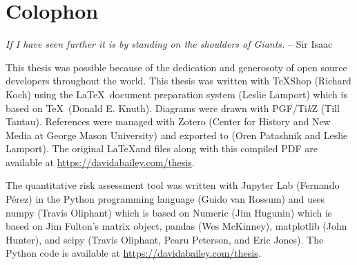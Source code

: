 \documentclass{article}
\begin{document}
\newpage
\section{Colophon}

\begin{mdframed}
    \emph{If I have seen further it is by standing on the shoulders of Giants.} -- Sir Isaac \cite{newton_letter_1675}
\end{mdframed}

\noindent This thesis was possible because of the dedication and generosoty of open source developers throughout the world. This thesis was written with TeXShop (Richard Koch) using the \LaTeX \ document preparation system (Leslie Lamport) which is based on \TeX \ (Donald E. Knuth). Diagrams were drawn with PGF/Ti\emph{k}Z (Till Tantau). References were managed with Zotero (Center for History and New Media at George Mason University) and exported to  (Oren Patashnik and Leslie Lamport). The original \LaTeX and  files along with this compiled PDF are available at \url{https://davidabailey.com/thesis}.


The quantitative risk assessment tool was written with Jupyter Lab (Fernando P\'{e}rez) in the Python programming language (Guido van Rossum) and uses numpy (Travis Oliphant) which is based on Numeric (Jim Hugunin) which is based on Jim Fulton's matrix object, pandas (Wes McKinney), matplotlib (John Hunter), and scipy (Travis Oliphant, Pearu Peterson, and Eric Jones). The Python code is available at \url{https://davidabailey.com/thesis}.
\end{document}
